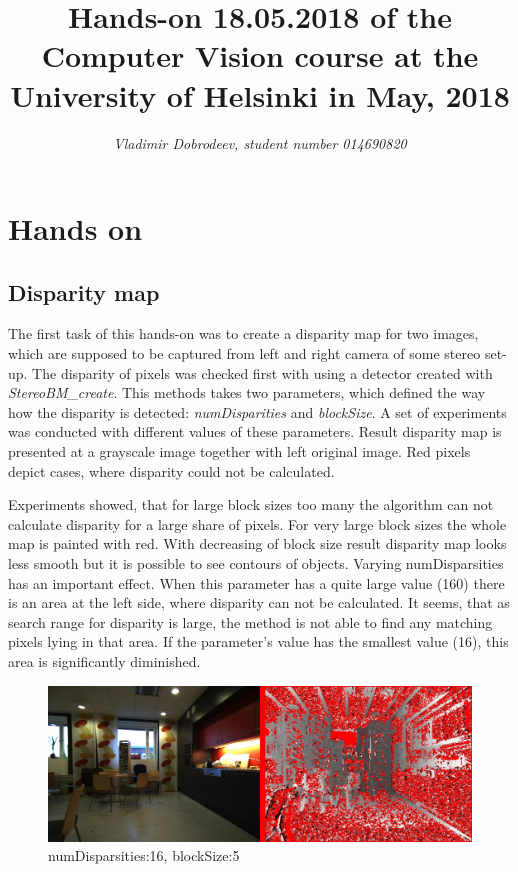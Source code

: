 \documentclass{article}
\begin{document}
\title{Hands-on 18.05.2018 of the Computer Vision course at the
  University of Helsinki in May, 2018}

\author{\emph{Vladimir Dobrodeev, student number 014690820}}
\maketitle

\newpage

\section{Hands on}

\subsection{Disparity map}

The first task of this hands-on was to create a disparity map for two images, which are supposed to be captured from left and right camera of some stereo set-up. The disparity of pixels was checked first with using a detector created with \textit{StereoBM\_create}. This methods takes two parameters, which defined the way how the disparity is detected: \textit{numDisparities} and \textit{blockSize}. A set of experiments was conducted with different values of these parameters. Result disparity map is presented at a grayscale image together with left original image. Red pixels depict cases, where disparity could not be calculated.

Experiments showed, that for large block sizes too many the algorithm can not calculate disparity for a large share of pixels. For very large block sizes the whole map is painted with red. With decreasing of block size result disparity map looks less smooth but it is possible to see contours of objects. Varying numDisparsities has an important effect. When this parameter has a quite large value (160) there is an area at the left side, where disparity can not be calculated. It seems, that as search range for disparity is large, the method is not able to find any matching pixels lying in that area. If the parameter's value has the smallest value (16), this area is significantly diminished.

\begin{figure}[H]
	\includegraphics[width=\textwidth]{n_16_b_5}
	\caption{numDisparsities:16, blockSize:5}
\end{figure}
\end{document}

